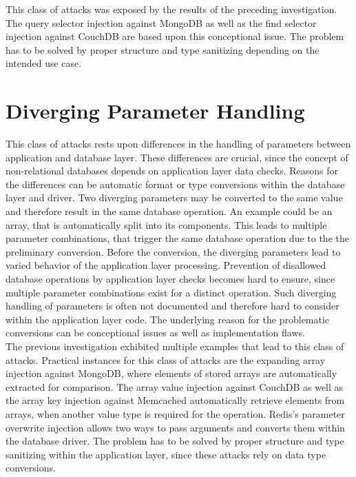 This class of attacks was exposed by the results of the preceding investigation. The query selector injection against MongoDB as well as the find selector injection against CouchDB are based upon this conceptional issue. The problem has to be solved by proper structure and type sanitizing depending on the intended use case.

\section{Diverging Parameter Handling}
This class of attacks rests upon differences in the handling of parameters between application and database layer. These differences are crucial, since the concept of non-relational databases depends on application layer data checks. Reasons for the differences can be automatic format or type conversions within the database layer and driver. Two diverging parameters may be converted to the same value and therefore result in the same database operation. An example could be an array, that is automatically split into its components. This leads to multiple parameter combinations, that trigger the same database operation due to the the preliminary conversion. Before the conversion, the diverging parameters lead to varied behavior of the application layer processing. Prevention of disallowed database operations by application layer checks becomes hard to ensure, since multiple parameter combinations exist for a distinct operation. Such diverging handling of parameters is often not documented and therefore hard to consider within the application layer code. The underlying reason for the problematic conversions can be conceptional issues as well as implementation flaws.\\

The previous investigation exhibited multiple examples that lead to this class of attacks. Practical instances for this class of attacks are the expanding array injection against MongoDB, where elements of stored arrays are automatically extracted for comparison. The array value injection against CouchDB as well as the array key injection against Memcached automatically retrieve elements from arrays, when another value type is required for the operation. Redis's parameter overwrite injection allows two ways to pass arguments and converts them within the database driver. The problem has to be solved by proper structure and type sanitizing within the application layer, since these attacks rely on data type conversions.

